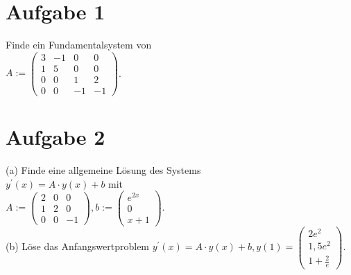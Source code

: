 \documentclass{scrartcl}
\begin{document}
\section*{Aufgabe 1}

Finde ein Fundamentalsystem von\\[0.3em]
$A:=\begin{pmatrix}3&-1&0&0\\1&5&0&0\\0&0&1&2\\0&0&-1&-1\end{pmatrix}$.

\section*{Aufgabe 2}

(a) Finde eine allgemeine L\"osung des Systems\\
$y^\prime(x)=A\cdot y(x)+b$ mit\\[0.3em]
$A:=\begin{pmatrix}2&0&0\\1&2&0\\0&0&-1\end{pmatrix},b:=\begin{pmatrix}e^{2x}\\0\\x+1\end{pmatrix}$.\\
(b) L\"ose das Anfangswertproblem $y^\prime(x)=A\cdot y(x)+b,y(1)=\begin{pmatrix}2e^2\\1,5e^2\\1+\frac 2 e\end{pmatrix}$.
\end{document}
